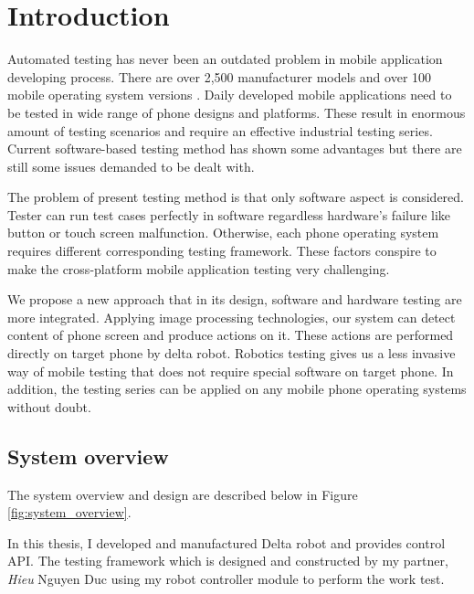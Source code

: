 \makeatletter
\def\maxwidth#1{\ifdim\Gin@nat@width>#1 #1\else\Gin@nat@width\fi}
\makeatother

\chapter{Introduction}

Automated testing has never been an outdated problem in mobile application developing process. There are over 2,500 manufacturer models and over 100 mobile operating system versions \cite{crittercism}. Daily developed mobile applications need to be tested in wide range of phone designs and platforms. These result in enormous amount of testing scenarios and require an effective industrial testing series. Current software-based testing method has shown some advantages but there are still some issues demanded to be dealt with.

The problem of present testing method is that only software aspect is considered. Tester can run test cases perfectly in software regardless hardware's failure like button or touch screen malfunction. Otherwise, each phone operating system requires different corresponding testing framework. These factors conspire to make the cross-platform mobile application testing very challenging. \nocite{weinman_thesis}

We propose a new approach that in its design, software and hardware testing are more integrated. Applying image processing technologies, our system can detect content of phone screen and produce actions on it. These actions are performed directly on target phone by delta robot. Robotics testing gives us a less invasive way of mobile testing that does not require special software on target phone. In addition, the testing series can be applied on any mobile phone operating systems without doubt.

\section{System overview}

The system overview and design are described below in Figure \ref{fig:system_overview}.

In this thesis, I developed and manufactured Delta robot and provides control API. The testing framework which is designed and constructed by my partner, \textit{Hieu} Nguyen Duc using my robot controller module to perform the work test.

